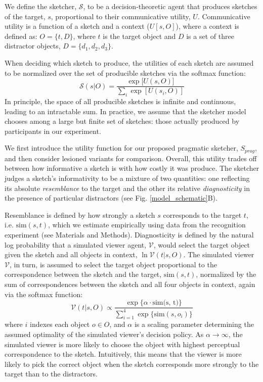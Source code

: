 \documentclass[9pt,twocolumn,twoside]{pnas-new}
\begin{document}
We define the sketcher, $\mathcal{S}$, to be a decision-theoretic agent that produces sketches of the target, $s$, proportional to their communicative utility, $U$.
Communicative utility is a function of a sketch and a context ($U[s,O]$), where a context is defined as:
$O = \{t,D\}$, where $t$ is the target object and $D$ is a set of three distractor objects, $D=\{d_1,d_2,d_3\}$.  

When deciding which sketch to produce, the utilities of each sketch are assumed to be normalized over the set of producible sketches via the softmax function: 
\begin{equation} \label{sketcher_distribution}
\mathcal{S}(s|O) = \frac {\exp [{U(s,O)]}} {\sum_{i} {\exp [U(s_i,O)]}}
\end{equation}
In principle, the space of all producible sketches is infinite and continuous, leading to an intractable sum.
In practice, we assume that the sketcher model chooses among a large but finite set of sketches: those actually produced by participants in our experiment.

We first introduce the utility function for our proposed pragmatic sketcher, $S_{prag}$, and then consider lesioned variants for comparison. 
Overall, this utility trades off between how informative a sketch is with how costly it was produce.
The sketcher judges a sketch's informativity to be a mixture of two quantities: one reflecting its absolute \textit{resemblance} to the target and the other its relative \textit{diagnosticity} in the presence of particular distractors (see Fig. \ref{model_schematic}B).  

Resemblance is defined by how strongly a sketch $s$ corresponds to the target $t$, i.e. $\textrm{sim}(s,t)$, which we estimate empirically using data from the recognition experiment (see Materials and Methods).
Diagnosticity is defined by the natural log probability that a simulated viewer agent, $\mathcal{V}$, would select the target object given the sketch and all objects in context, $\ln \mathcal{V}(t|s,O)$. 
The simulated viewer $\mathcal{V}$, in turn, is assumed to select the target object proportional to the correspondence between the sketch and the target, $\textrm{sim}(s,t)$, normalized by the sum of correspondences between the sketch and all four objects in context, again via the softmax function:
\begin{equation} \label{literal_viewer_score}
\mathcal{V}(t|s,O) \propto \frac {\exp\{\alpha \cdot \textrm{sim(s, t)}\}} {\sum_{i=1}^{4} \exp\{\textrm{sim}(s,o_i)\}}
\end{equation}
where $i$ indexes each object $o\in O$, and $\alpha$ is a scaling parameter determining the assumed optimality of the simulated viewer's decision policy. 
As $\alpha \rightarrow \infty$, the simulated viewer is more likely to choose the object with highest perceptual correspondence to the sketch. 
Intuitively, this means that the viewer is more likely to pick the correct object when the sketch corresponds more strongly to the target than to the distractors. 
\end{document}
